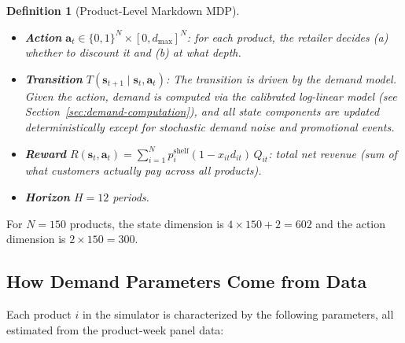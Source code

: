 \documentclass[12pt,a4paper]{article}
\newtheorem{definition}{Definition}
\begin{document}
\begin{definition}[Product-Level Markdown MDP]
\begin{itemize}[nosep]
\item \textbf{Action} $\mathbf{a}_t \in \{0,1\}^N \times
[0, d_{\max}]^N$: for each product, the retailer decides (a) whether
to discount it and (b) at what depth.

\item \textbf{Transition}
$T(\mathbf{s}_{t+1} \mid \mathbf{s}_t, \mathbf{a}_t)$:
The transition is driven by the demand model. Given the action, demand
is computed via the calibrated log-linear model (see
Section~\ref{sec:demand-computation}), and all state components are
updated deterministically except for stochastic demand noise and
promotional events.

\item \textbf{Reward}
$R(\mathbf{s}_t, \mathbf{a}_t) = \sum_{i=1}^{N}
p_i^{\text{shelf}} (1 - x_{it} d_{it}) \, Q_{it}$:
total net revenue (sum of what customers actually pay across all
products).

\item \textbf{Horizon} $H = 12$ periods.
\end{itemize}
\end{definition}

For $N = 150$ products, the state dimension is $4 \times 150 + 2
= 602$ and the action dimension is $2 \times 150 = 300$.

\subsection{How Demand Parameters Come from Data}
\label{sec:param-origin}

Each product $i$ in the simulator is characterized by the following
parameters, all estimated from the product-week panel data:
\end{document}

